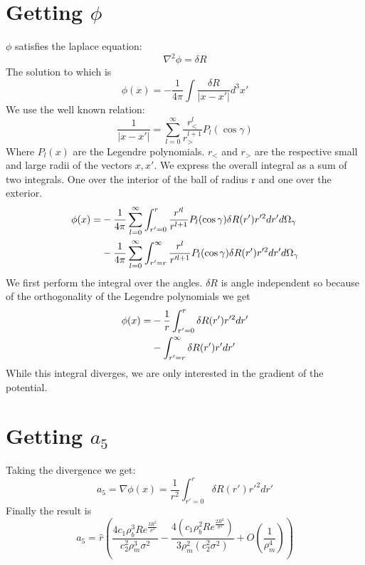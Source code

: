 \documentclass[10pt,a4paper]{report}
\begin{document}
\section{Getting $\phi$}
$\phi$ satisfies the laplace equation:
\begin{equation}
\nabla^2\phi=\delta R
\end{equation}
The solution to which is
\begin{equation}
\phi(x)=-\frac{1}{4\pi}\int\frac{\delta R}{|x-x'|}d^3x'
\end{equation}
We use the well known relation:
\begin{equation}
\frac{1}{|x-x'|}=\sum_{l=0}^\infty \frac{r_{<}^l}{r_{>}^{l+1}}P_l(\cos \gamma)
\end{equation}
Where $P_l(x)$ are the Legendre polynomials. $r_<$ and $r_>$ are the respective small and large radii of the vectors $x,x'$.
We express the overall integral as a sum of two integrals. One over the interior of the ball of radius r and one over the exterior.
\begin{align}
\phi(x)=&-\frac{1}{4\pi}\sum_{l=0}^\infty\int_{r'=0}^r \frac{r'^l}{r^{l+1}}P_l(\cos \gamma) \delta R(r')r'^2 dr'd\Omega_\gamma \notag \\
&-\frac{1}{4\pi}\sum_{l=0}^\infty\int_{r'=r}^\infty \frac{r^l}{r'^{l+1}}P_l(\cos \gamma) \delta R(r')r'^2 dr'd\Omega_\gamma
\end{align}
We first perform the integral over the angles. $\delta R$ is angle independent so because of the orthogonality of the Legendre polynomials we get
\begin{align}
\phi(x)=&-\frac{1}{r}\int_{r'=0}^r \delta R(r')r'^2 dr' \notag \\
&-\int_{r'=r}^\infty \delta R(r')r' dr'
\end{align}
While this integral diverges, we are only interested in the gradient of the potential.
\section{Getting $a_5$}
Taking the divergence we get:
\begin{equation}
a_5=\nabla\phi(x)=\frac{1}{r^2}\int_{r'=0}^r \delta R(r')r'^2 dr'
\end{equation}
Finally the result is
\begin{equation}
a_5=\hat{r}\left(\frac{4c_1 \rho_b^3 R e^{\frac{3 R^2}{\sigma ^2}}}{c_2^2 \rho_m^3 \sigma ^2}-\frac{4 \left(c_1 \rho_b^2 R e^{\frac{2 R^2}{\sigma ^2}}\right)}{3 \rho_m^2 \left(c_2^2 \sigma ^2\right)}+O\left(\frac{1}{\rho_m^4}\right)\right)
\end{equation}
\end{document}
